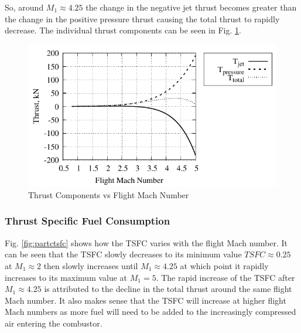 \documentclass[conf]{new-aiaa} %
\begin{document}
So, around $M_1\approx4.25$ the change in the negative jet thrust becomes greater than the change in the positive pressure thrust causing the total thrust to rapidly decrease. The individual thrust components can be seen in Fig. \ref{fig:partcallthrust}.

\begin{figure}[H] %
    \centering
    \includegraphics[]{media/performance_parameter_files/part_c_all_thrust.pdf}
    \caption{\label{fig:partcallthrust}Thrust Components vs Flight Mach Number}
\end{figure}

\subsubsection{Thrust Specific Fuel Consumption}
Fig. \ref{fig:partctsfc} shows how the TSFC varies with the flight Mach number. It can be seen that the TSFC slowly decreases to its minimum value $TSFC\approx0.25$ at $M_1\approx2$ then slowly increases until $M_1\approx4.25$ at which point it rapidly increases to its maximum value at $M_1=5$. The rapid increase of the TSFC after $M_1\approx4.25$ is attributed to the decline in the total thrust around the same flight Mach number. It also makes sense that the TSFC will increase at higher flight Mach numbers as more fuel will need to be added to the increasingly compressed air entering the combustor.
\end{document}
